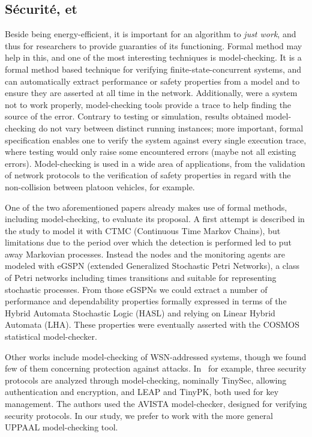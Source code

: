         \subsection{Sécurité,  et \resilience}



Beside being energy-efficient, it is important for an algorithm to \emph{just work}, and thus for researchers to provide guaranties of its functioning.
Formal method may help in this, and one of the most interesting techniques is model-checking.
It is a formal method based technique for verifying finite-state-concurrent systems, and can automatically extract performance or safety properties from a model and to ensure they are asserted at all time in the network.
Additionally, were a system not to work properly, model-checking tools provide a trace to help finding the source of the error.
Contrary to testing or simulation, results obtained \via model-checking do not vary between distinct running instances; more important, formal specification enables one to verify the system against every single execution trace, where testing would only raise some encountered errors (maybe not all existing errors).
Model-checking is used in a wide area of applications, from the validation of network protocols to the verification of safety properties in regard with the non-collision between platoon vehicles\cite{E-ZCGGK12}, for example.

One of the two aforementioned papers already makes use of formal methods, including model-checking, to evaluate its proposal\cite{BMM13}.
A first attempt is described in the study to model it with CTMC (Continuous Time Markov Chains), but limitations due to the period over which the detection is performed led to put away Markovian processes.
Instead the nodes and the monitoring agents are modeled with eGSPN (extended Generalized Stochastic Petri Networks), a class of Petri networks including times transitions and suitable for representing stochastic processes.
From those eGSPNs we could extract a number of performance and dependability properties formally expressed in terms of the Hybrid Automata Stochastic Logic (HASL\cite{BDDHP11hasl}) and relying on Linear Hybrid Automata (LHA).
These properties were eventually asserted with the COSMOS statistical model-checker\cite{BDDHP11cosmos}.

Other works include model-checking of WSN-addressed systems, though we found few of them concerning protection against \DoS attacks.
In~\cite{TCCDC09} for example, three security protocols are analyzed through model-checking, nominally TinySec, allowing authentication and encryption, and LEAP and TinyPK, both used for key management. 
The authors used the AVISTA model-checker, designed for verifying security protocols.
In our study, we prefer to work with the more general UPPAAL model-checking tool.


